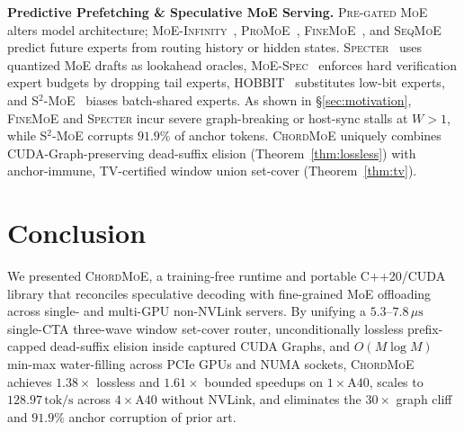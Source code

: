 \documentclass[10pt,twocolumn]{article}
\theoremstyle{definition}
\begin{document}
\vspace{2pt}
\noindent\textbf{Predictive Prefetching \& Speculative MoE Serving.}
\textsc{Pre-gated MoE}~\cite{hwang2024pregated} alters model architecture; \textsc{MoE-Infinity}~\cite{xue2024moeinfinity}, \textsc{ProMoE}~\cite{song2024promoe}, \textsc{FineMoE}~\cite{finemoe2026}, and \textsc{SeqMoE}~\cite{seqmoe2026} predict future experts from routing history or hidden states. \textsc{Specter}~\cite{specter2026} uses quantized MoE drafts as lookahead oracles, \textsc{MoE-Spec}~\cite{moespec2026} enforces hard verification expert budgets by dropping tail experts, \textsc{HOBBIT}~\cite{tang2024hobbit} substitutes low-bit experts, and \textsc{S$^2$-MoE}~\cite{s2moe2026} biases batch-shared experts. As shown in \S\ref{sec:motivation}, \textsc{FineMoE} and \textsc{Specter} incur severe graph-breaking or host-sync stalls at $W > 1$, while \textsc{S$^2$-MoE} corrupts $91.9\%$ of anchor tokens. \textsc{ChordMoE} uniquely combines CUDA-Graph-preserving dead-suffix elision (Theorem~\ref{thm:lossless}) with anchor-immune, TV-certified window union set-cover (Theorem~\ref{thm:tv}).

\section{Conclusion}
\label{sec:conclusion}

We presented \textsc{ChordMoE}, a training-free runtime and portable C++20/CUDA library that reconciles speculative decoding with fine-grained MoE offloading across single- and multi-GPU non-NVLink servers. By unifying a $5.3\text{--}7.8\,\mu\text{s}$ single-CTA three-wave window set-cover router, unconditionally lossless prefix-capped dead-suffix elision inside captured CUDA Graphs, and $O(M \log M)$ min-max water-filling across PCIe GPUs and NUMA sockets, \textsc{ChordMoE} achieves $1.38\times$ lossless and $1.61\times$ bounded speedups on $1\times\text{A40}$, scales to $128.97\,\text{tok/s}$ across $4\times\text{A40}$ without NVLink, and eliminates the $30\times$ graph cliff and $91.9\%$ anchor corruption of prior art.

{\footnotesize


}
\end{document}
